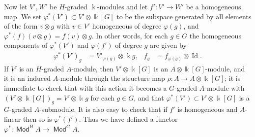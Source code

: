 \documentclass[11pt,fleqn]{article}
\newcommand\ot{\otimes}
\renewcommand\to{\longrightarrow}
\renewcommand\phi{\varphi}
\renewcommand\k{\Bbbk}
\DeclareMathOperator\Mod{\mathsf{Mod}}
\DeclareMathOperator\Id{Id}
\begin{document}
Now let $V',W'$ be $H$-graded $\k$-modules and let $f': V' \to W'$ be a 
homogeneous map. We set $\phi^*(V') \subset V' \ot \k[G]$ to be the 
subspace generated by all elements of the form $v \ot g$ with $v \in V'$ 
homogeneous of degree $\phi(g)$, and $\phi^*(f)(v \ot g) = f(v) \ot g$. In 
other words, for each $g \in G$ the homogeneous components of $\phi^*(V')$
and $\phi(f')$ of degree $g$ are given by
\begin{align*}
\phi^*(V')_g 
  &=  V'_{\phi(g)} \ot \k g,
  &f_g
  &= f_{\phi(g)} \ot \Id.
\end{align*}
If $V'$ is an $H$-graded $A$-module, then $V' \ot \k[G]$ is an $A \ot 
\k[G]$-module, and it is an induced $A$-module through the structure map 
$\rho: A \to A \ot \k[G]$; it is immediate to check that with this action it 
becomes a $G$-graded $A$-module with $(V' \ot \k[G])_g = V' \ot \k g$ for 
each $g \in G$, and that $\phi^*(V') \subset V' \ot \k[G]$ is a $G$-graded 
$A$-submodule. It is also easy to check that if $f'$ is homogeneous and 
$A$-linear then so is $\phi^*(f')$. Thus we have defined a functor $\phi^*: 
\Mod^H A \to \Mod^G A$.
\end{document}
